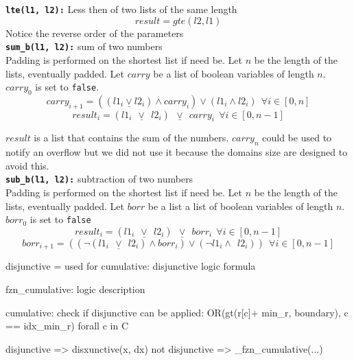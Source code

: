 \texttt{\textbf{lte(l1, l2):}} Less then of two lists of the same length\\
\begin{equation}
    result = gte(l2, l1)
\end{equation}
Notice the reverse order of the parameters\\

\texttt{\textbf{sum\_b(l1, l2):}} sum of two numbers\\
Padding is performed on the shortest list if need be.
Let $n$ be the length of the lists, eventually padded. Let $carry$ be a list of boolean
variables of length $n$. $carry_0$ is set to \texttt{false}.  
\begin{equation}
    carry_{i+1} = ((l1_i \underline\vee l2_i) \wedge carry_i) \vee (l1_i \wedge l2_i)  \  \ \forall i \in [0, n]
\end{equation}
\begin{equation}
        result_i = (l1_i \ \ \underline\vee \ \ l2_i) \ \ \underline\vee \ \ carry_i \  \ \forall i \in [0, n-1]
\end{equation}

$result$ is a list that contains the sum of the numbers. $carry_n$ could be used to
notify an overflow but we did  not use it because the domains size are designed to avoid this.\\

\texttt{\textbf{sub\_b(l1, l2):}} subtraction of two numbers\\
Padding is performed on the shortest list if need be.
Let $n$ be the length of the lists, eventually padded.
Let $borr$ be a list a list of boolean variables of length $n$. $borr_0$ is set to \texttt{false} 
\begin{equation}
    result_i = (l1_i \ \ \underline\vee \ \ l2_i) \ \ \underline\vee \ \ borr_i \  \ \forall i \in [0, n-1]
\end{equation}
\begin{equation}
    borr_{i+1} = ((\neg (l1_i \ \ \underline\vee \ \ l2_i) \wedge borr_i) \vee (\neg l1_i \wedge \ \ l2_i)) \  \ 
    \forall i \in [0, n-1]
\end{equation}

disjunctive = used for cumulative:
disjunctive logic formula


fzn\_cumulative:
logic description

cumulative:
check if disjunctive can be applied:
OR(gt(r[c]+ min\_r, boundary), c == idx\_min\_r) forall c in C

disjunctive => disxunctive(x, dx)
not disjunctive => \_fzn\_cumulative(...)

